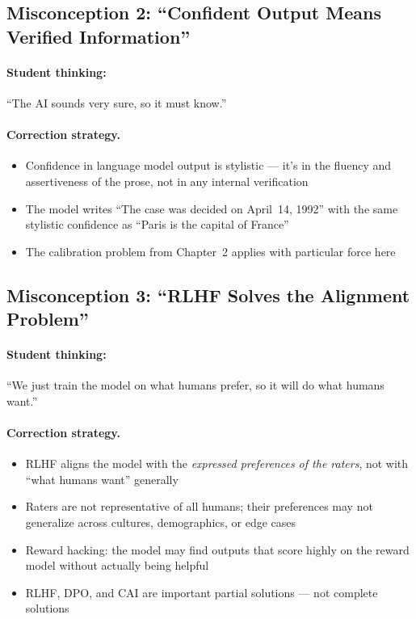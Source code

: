 \subsection{Misconception 2: ``Confident Output Means Verified Information''}

\paragraph{Student thinking:} ``The AI sounds very sure, so it must know.''

\paragraph{Correction strategy.}
\begin{itemize}
    \item Confidence in language model output is stylistic --- it's in the fluency and assertiveness of the prose, not in any internal verification
    \item The model writes ``The case was decided on April~14, 1992'' with the same stylistic confidence as ``Paris is the capital of France''
    \item The calibration problem from Chapter~2 applies with particular force here
\end{itemize}

\subsection{Misconception 3: ``RLHF Solves the Alignment Problem''}

\paragraph{Student thinking:} ``We just train the model on what humans prefer, so it will do what humans want.''

\paragraph{Correction strategy.}
\begin{itemize}
    \item RLHF aligns the model with the \emph{expressed preferences of the raters}, not with ``what humans want'' generally
    \item Raters are not representative of all humans; their preferences may not generalize across cultures, demographics, or edge cases
    \item Reward hacking: the model may find outputs that score highly on the reward model without actually being helpful
    \item RLHF, DPO, and CAI are important partial solutions --- not complete solutions
\end{itemize}

